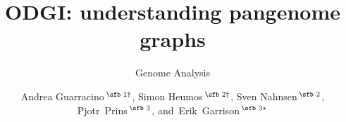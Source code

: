 \documentclass{bioinfo}
\begin{document}

\subtitle{Genome Analysis}

\title[ODGI: understanding pangenome graphs]{ODGI: understanding pangenome graphs}
\author[Guarracino, Heumos \textit{et~al}.]{
Andrea Guarracino\,$^{\text{\sfb 1} \dagger}$,
Simon Heumos\,$^{\text{\sfb 2} \dagger}$,
Sven Nahnsen\,$^{\text{\sfb 2}}$,
Pjotr~Prins\,$^{\text{\sfb 3}}$,
and~Erik~Garrison\,$^{\text{\sfb 3}*}$
}

\address{
$^{\text{\sf 1}}$University of Tor Vergata, Rome, Italy \\
$^{\text{\sf 2}}$Quantitative Biology Center (QBiC), University of T\"ubingen, T\"ubingen, Germany, 72076 \\
$^{\text{\sf 3}}$University of Tennessee Health Science Center, Memphis, TN, USA
}




\end{document}

